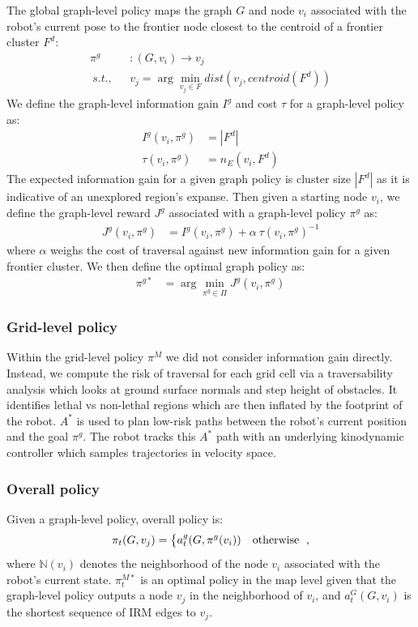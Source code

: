 \documentclass{article}
\begin{document}
The global graph-level policy maps the graph $G$ and node $v_i$ associated with the robot's current pose to the frontier node closest to the centroid of a frontier cluster $F^d$:
\begin{align}
  \pi^g&: (G,v_i) \rightarrow v_{j} \nonumber \\
  ~s.t.,~~~ &v_j= \arg\min_{v_j \in F} dist(v_{j}, centroid(F^d))
\end{align}
We define the graph-level information gain $I^g$ and cost $\tau$ for a graph-level policy as:
\begin{align}
    I^g(v_i,\pi^g) &= |F^d| \nonumber \\
    \tau(v_i,\pi^g) &= n_E(v_i,F^d) 
\end{align}
The expected information gain for a given graph policy is cluster size $|F^d|$ as it is indicative of an unexplored region's expanse. Then given a starting node $v_i$, we define the graph-level reward $J^g$ associated with a graph-level policy $\pi^g$ as: 
\begin{align}
    J^{g}(v_i, \pi^g) &= I^g(v_i,\pi^g) + \alpha~\tau(v_i,\pi^g)^{-1}
\end{align}
where $\alpha$ weighs the cost of traversal against new information gain for a given frontier cluster. We then define the optimal graph policy as:
\begin{align}
    \pi^{g*} &= \arg\min_{\pi^g \in \Pi} J^{g}(v_i, \pi^g) \nonumber
\end{align}

\subsubsection{Grid-level policy}
Within the grid-level policy $\pi^M$ we did not consider information gain directly.  Instead, we compute the risk of traversal for each grid cell via a traversability analysis which looks at ground surface normals and step height of obstacles.  It identifies lethal vs non-lethal regions which are then inflated by the footprint of the robot.  $A^*$ is used to plan low-risk paths between the robot's current position and the goal $\pi^g$.  The robot tracks this $A^*$ path with an underlying kinodynamic controller which samples trajectories in velocity space.

\subsubsection{Overall policy}
Given a graph-level policy, overall policy is:
\begin{align}
  \pi_t(G, v_j) = 
  \begin{dcases*}
    a_t^g(G, \pi^g(v_i)) & otherwise 
  \end{dcases*},
\end{align}
where $\mathbb{N}(v_i)$ denotes the neighborhood of the node $v_i$ associated with the robot's current state. $\pi_t^{M*}$ is an optimal policy in the map level given that the graph-level policy outputs a node $v_j$ in the neighborhood of $v_i$, and $a_t^G(G, v_i)$ is the shortest sequence of IRM edges to $v_j$.
\end{document}
